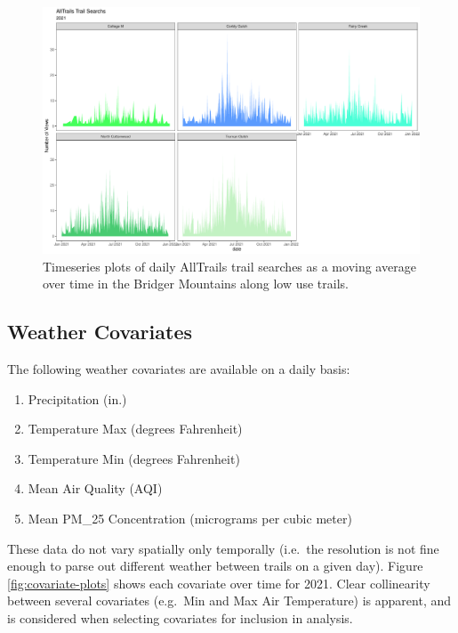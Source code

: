 \documentclass[
]{book}
\providecommand{\tightlist}{%
  \setlength{\itemsep}{0pt}\setlength{\parskip}{0pt}}
\begin{document}
\begin{figure}

{\centering \includegraphics[width=1\linewidth]{../figures/allTrails_search_TS_low} 

}

\caption{Timeseries plots of daily AllTrails trail searches as a moving average over time in the Bridger Mountains along low use trails.}\label{fig:alltrails-bytrailname-low}
\end{figure}

\hypertarget{weather-covariates}{%
\subsection{Weather Covariates}\label{weather-covariates}}

The following weather covariates are available on a daily basis:

\begin{enumerate}
\def\labelenumi{\arabic{enumi}.}
\tightlist
\item
  Precipitation (in.)
\item
  Temperature Max (degrees Fahrenheit)
\item
  Temperature Min (degrees Fahrenheit)
\item
  Mean Air Quality (AQI)
\item
  Mean PM\_25 Concentration (micrograms per cubic meter)
\end{enumerate}

These data do not vary spatially only temporally (i.e.~the resolution is
not fine enough to parse out different weather between trails on a given
day). Figure \ref{fig:covariate-plots} shows each covariate over time
for 2021. Clear collinearity between several covariates (e.g.~Min and
Max Air Temperature) is apparent, and is considered when selecting
covariates for inclusion in analysis.
\end{document}
